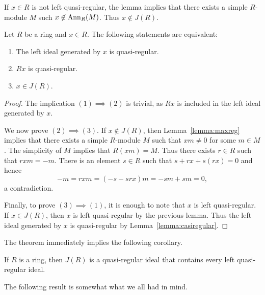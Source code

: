 If $x\in R$ is not left quasi-regular, the lemma implies that there exists 
a simple $R$-module $M$ such $x\not\in\operatorname{Ann}_R(M)$. Thus 
$x\not\in J(R)$.

\begin{theorem}
	\label{thm:casireg_eq}
	Let $R$ be a ring and $x\in R$. The following statements are equivalent: 
	\begin{enumerate}
		\item The left ideal generated by $x$ is quasi-regular.
		\item $Rx$ is quasi-regular.
		\item $x\in J(R)$.
	\end{enumerate}
\end{theorem}

\begin{proof}
	The implication $(1)\implies(2)$ is trivial, as $Rx$ is included in the left ideal 
	generated by $x$.  
	
	We now prove $(2)\implies(3)$. If
	$x\not\in J(R)$, then Lemma~\ref{lemma:maxreg} implies that there exists a simple 
	$R$-module $M$ such that $xm\ne 0$ for some $m\in M$. The simplicity of $M$ implies
	that $R(xm)=M$. Thus there exists $r\in R$ such that $rxm=-m$. There is an element 
	$s\in R$ such that $s+rx+s(rx)=0$ and hence 
	\[
	-m=rxm=(-s-srx)m=-sm+sm=0,
	\]
	a contradiction. 
	
	Finally, to prove $(3)\implies(1)$, it is enough to note that 
	$x$ is left quasi-regular. If $x\in J(R)$, 
	then $x$ is left quasi-regular by 
	the previous lemma. 
	Thus the left ideal generated by 
	$x$ is quasi-regular by Lemma~\ref{lemma:casiregular}.
\end{proof}

The theorem immediately implies the following corollary. 

\begin{corollary}
	If $R$ is a ring, then $J(R)$ is a quasi-regular ideal that contains every 
	left quasi-regular ideal. 
\end{corollary}

The following result is somewhat what we all had in mind. 


